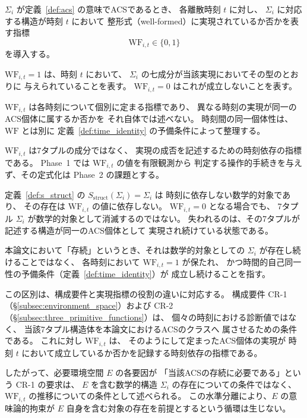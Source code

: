 \begin{definition}
\label{def:wf_realization}
$\Sigma_i$ が定義~\ref{def:acs} の意味でACSであるとき、
各離散時刻 $t$ に対し、
$\Sigma_i$ に対応する構造が時刻 $t$ において
整形式（well-formed）に実現されているか否かを表す指標
\[
  \mathrm{WF}_{i,t}\in\{0,1\}
\]
を導入する。

$\mathrm{WF}_{i,t}=1$ は、時刻 $t$ において、
$\Sigma_i$ の七成分が当該実現においてその型のとおりに
与えられていることを表す。
$\mathrm{WF}_{i,t}=0$ はこれが成立しないことを表す。

$\mathrm{WF}_{i,t}$ は各時刻について個別に定まる指標であり、
異なる時刻の実現が同一のACS個体に属するか否かを
それ自体では述べない。
時刻間の同一個体性は、$\mathrm{WF}$ とは別に
定義~\ref{def:time_identity} の予備条件によって整理する。

$\mathrm{WF}_{i,t}$ は7タプルの成分ではなく、
実現の成否を記述するための時刻依存の指標である。
Phase~1 では $\mathrm{WF}_{i,t}$ の値を有限観測から
判定する操作的手続きを与えず、その定式化は Phase~2 の課題とする。
\end{definition}

\begin{remark}[数学的水準と実現水準の分離]
\label{rem:math_vs_realization}
定義~\ref{def:s_struct} の
$S_{\mathrm{struct}}(\Sigma_i)=\Sigma_i$ は
時刻に依存しない数学的対象であり、
その存在は $\mathrm{WF}_{i,t}$ の値に依存しない。
$\mathrm{WF}_{i,t}=0$ となる場合でも、
7タプル $\Sigma_i$ が数学的対象として消滅するのではない。
失われるのは、その7タプルが記述する構造が同一のACS個体として
実現され続けている状態である。

本論文において「存続」というとき、それは数学的対象としての
$\Sigma_i$ が存在し続けることではなく、
各時刻において $\mathrm{WF}_{i,t}=1$ が保たれ、
かつ時間的自己同一性の予備条件（定義~\ref{def:time_identity}）が
成立し続けることを指す。

この区別は、構成要件と実現指標の役割の違いに対応する。
構成要件 CR-1（\S\ref{subsec:environment_space}）および
CR-2（\S\ref{subsec:three_primitive_functions}）は、
個々の時刻における診断値ではなく、
当該7タプル構造体を本論文におけるACSのクラスへ
属させるための条件である。
これに対し $\mathrm{WF}_{i,t}$ は、
そのようにして定まったACS個体の実現が
時刻 $t$ において成立しているか否かを記録する時刻依存の指標である。

したがって、必要環境空間 $E$ の各要因が
「当該ACSの存続に必要である」という CR-1 の要求は、
$E$ を含む数学的構造 $\Sigma_i$ の存在についての条件ではなく、
$\mathrm{WF}_{i,t}$ の推移についての条件として述べられる。
この水準分離により、$E$ の意味論的拘束が
$E$ 自身を含む対象の存在を前提とするという循環は生じない。
\end{remark}

